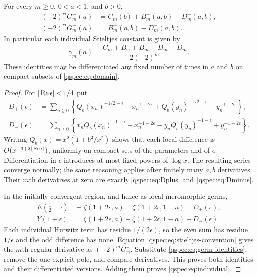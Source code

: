 \begin{theorem}
\label{qspec:thm:master}
For every $m\ge0$, $0<a<1$, and $b>0$,
\begin{align}
(-2)^mG_m^+(a)&=C_m(b)+B_m^+(a,b)-D_m^+(a,b),\label{qspec:eq:master-plus}\\
(-2)^mG_m^-(a)&=B_m^-(a,b)-D_m^-(a,b).\label{qspec:eq:master-minus}
\end{align}
In particular each individual Stieltjes constant is given by
\begin{equation}\label{qspec:eq:individual}
\gamma_m(a)=\frac{C_m+B_m^++B_m^--D_m^+-D_m^-}{2(-2)^m}.
\end{equation}
These identities may be differentiated any fixed number of times in $a$
and $b$ on compact subsets of \eqref{qspec:eq:domain}.
\end{theorem}
\begin{proof}
For $|\operatorname{Re}\epsilon|<1/4$ put
\begin{align*}
D_+(\epsilon)&=\sum_{n\ge0}\left\{
Q_b(x_n)^{-1/2-\epsilon}-x_n^{-1-2\epsilon}
+Q_b(y_n)^{-1/2-\epsilon}-y_n^{-1-2\epsilon}\right\},\\
D_-(\epsilon)&=\sum_{n\ge0}\left\{
x_nQ_b(x_n)^{-1-\epsilon}-x_n^{-1-2\epsilon}
-y_nQ_b(y_n)^{-1-\epsilon}+y_n^{-1-2\epsilon}\right\}.
\end{align*}
Writing $Q_b(x)=x^2(1+b^2/x^2)$ shows that each local difference
is $O(x^{-3+2|\operatorname{Re}\epsilon|})$, uniformly on compact sets of the
parameters and of $\epsilon$. Differentiation in $\epsilon$ introduces
at most fixed powers of $\log x$. The resulting series converge normally;
the same reasoning applies after finitely many $a,b$ derivatives.
Their $m$th derivatives at zero are exactly
\eqref{qspec:eq:Dplus} and~\eqref{qspec:eq:Dminus}.

In the initially convergent region, and hence as local meromorphic germs,
\begin{align}
E(\tfrac12+\epsilon)&=
\zeta(1+2\epsilon,a)+\zeta(1+2\epsilon,1-a)+D_+(\epsilon),\label{qspec:eq:even-subtraction}\\
Y(1+\epsilon)&=
\zeta(1+2\epsilon,a)-\zeta(1+2\epsilon,1-a)+D_-(\epsilon).
\label{qspec:eq:odd-subtraction}
\end{align}
Each individual Hurwitz term has residue $1/(2\epsilon)$, so the even
sum has residue $1/\epsilon$ and the odd difference has none. Equation
\eqref{qspec:eq:stieltjes-convention} gives the $m$th regular derivative
as $(-2)^mG_m^\pm$. Substitute \eqref{qspec:eq:germ-identities}, remove
the one explicit pole, and compare derivatives. This proves both
identities and their differentiated versions. Adding them proves
\eqref{qspec:eq:individual}.
\end{proof}

